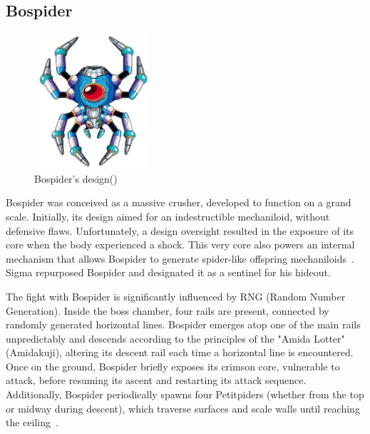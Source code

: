 \subsection{Bospider}\label{boss:bospider}
\begin{figure}[htp]
	\centering
	\includegraphics[height=5cm]{figures/X1/Sigma_stages/Bospider.jpg}
	\caption{Bospider's design(\cite{book:MMX_Complete_art})}
\end{figure}
Bospider was conceived as a massive crusher, developed to function on a grand scale. Initially, its design aimed for an indestructible mechaniloid, without defensive flaws. Unfortunately, a design oversight resulted in the exposure of its core when the body experienced a shock. This very core also powers an internal mechanism that allows Bospider to generate spider-like offspring mechaniloids~\cite{wayback:X_resources}. Sigma repurposed Bospider and designated it as a sentinel for his hideout.

The fight with Bospider is significantly influenced by RNG (Random Number Generation). Inside the boss chamber, four rails are present, connected by randomly generated horizontal lines. Bospider emerges atop one of the main rails unpredictably and descends according to the principles of the "Amida Lotter" (Amidakuji), altering its descent rail each time a horizontal line is encountered. Once on the ground, Bospider briefly exposes its crimson core, vulnerable to attack, before resuming its ascent and restarting its attack sequence. Additionally, Bospider periodically spawns four Petitpiders (whether from the top or midway during descent), which traverse surfaces and scale walls until reaching the ceiling~\cite{wiki:Bospider}.

